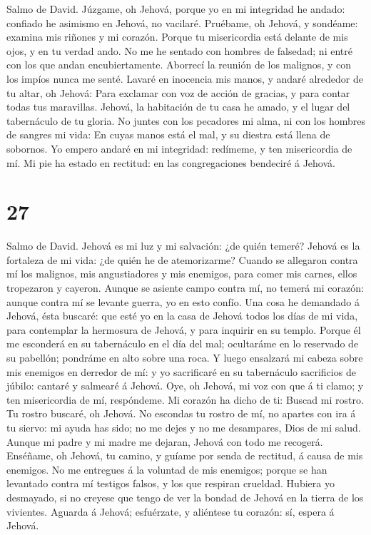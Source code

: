  Salmo de David. Júzgame, oh Jehová, porque yo en mi
integridad he andado: confiado he asimismo en Jehová, no vacilaré.
 Pruébame, oh Jehová, y sondéame: examina mis riñones y mi
corazón.  Porque tu misericordia está delante de mis ojos,
y en tu verdad ando.  No me he sentado con hombres de
falsedad; ni entré con los que andan encubiertamente. 
Aborrecí la reunión de los malignos, y con los impíos nunca me senté.
 Lavaré en inocencia mis manos, y andaré alrededor de tu
altar, oh Jehová:  Para exclamar con voz de acción de
gracias, y para contar todas tus maravillas.  Jehová, la
habitación de tu casa he amado, y el lugar del tabernáculo de tu gloria.
 No juntes con los pecadores mi alma, ni con los hombres
de sangres mi vida:  En cuyas manos está el mal, y su
diestra está llena de sobornos.  Yo empero andaré en mi
integridad: redímeme, y ten misericordia de mí.  Mi pie
ha estado en rectitud: en las congregaciones bendeciré á Jehová.

\hypertarget{section-26}{%
\section{27}\label{section-26}}

 Salmo de David. Jehová es mi luz y mi salvación: ¿de
quién temeré? Jehová es la fortaleza de mi vida: ¿de quién he de
atemorizarme?  Cuando se allegaron contra mí los malignos,
mis angustiadores y mis enemigos, para comer mis carnes, ellos
tropezaron y cayeron.  Aunque se asiente campo contra mí,
no temerá mi corazón: aunque contra mí se levante guerra, yo en esto
confío.  Una cosa he demandado á Jehová, ésta buscaré: que
esté yo en la casa de Jehová todos los días de mi vida, para contemplar
la hermosura de Jehová, y para inquirir en su templo. 
Porque él me esconderá en su tabernáculo en el día del mal; ocultaráme
en lo reservado de su pabellón; pondráme en alto sobre una roca.
 Y luego ensalzará mi cabeza sobre mis enemigos en
derredor de mí: y yo sacrificaré en su tabernáculo sacrificios de
júbilo: cantaré y salmearé á Jehová.  Oye, oh Jehová, mi
voz con que á ti clamo; y ten misericordia de mí, respóndeme.
 Mi corazón ha dicho de ti: Buscad mi rostro. Tu rostro
buscaré, oh Jehová.  No escondas tu rostro de mí, no
apartes con ira á tu siervo: mi ayuda has sido; no me dejes y no me
desampares, Dios de mi salud.  Aunque mi padre y mi madre
me dejaran, Jehová con todo me recogerá.  Enséñame, oh
Jehová, tu camino, y guíame por senda de rectitud, á causa de mis
enemigos.  No me entregues á la voluntad de mis enemigos;
porque se han levantado contra mí testigos falsos, y los que respiran
crueldad.  Hubiera yo desmayado, si no creyese que tengo
de ver la bondad de Jehová en la tierra de los vivientes.
 Aguarda á Jehová; esfuérzate, y aliéntese tu corazón:
sí, espera á Jehová.

